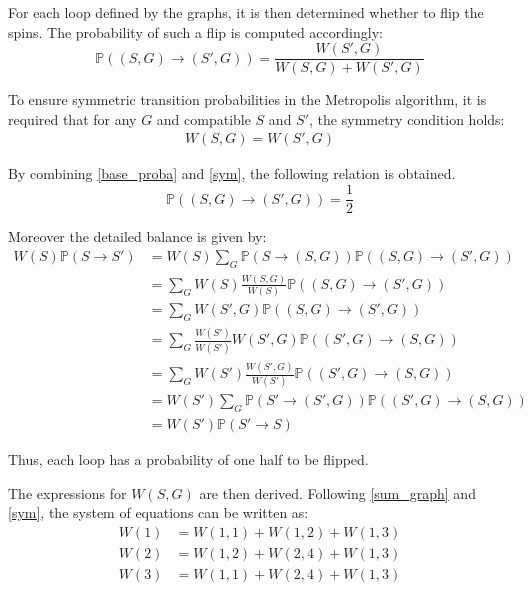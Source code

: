\documentclass[a4paper]{article}
\begin{document}
For each loop defined by the graphs, it is then determined whether to flip the spins. The probability of such a flip is computed accordingly:
\begin{equation} \label{base_proba}
    \mathbb{P}\left((S, G) \to (S', G)\right) = \frac{W(S', G)}{W(S, G) + W(S', G)}
\end{equation}

To ensure symmetric transition probabilities in the Metropolis algorithm, it is required that for any $G$ and compatible $S$ and $S'$, the symmetry condition holds:
\begin{align} \label{sym}
    W(S, G) = W(S', G)
\end{align}

By combining \cref{base_proba} and \cref{sym}, the following relation is obtained.
\begin{equation}
    \mathbb{P}\left((S, G) \to (S', G)\right) = \frac{1}{2}
\end{equation}

Moreover the detailed balance is given by:
\begin{align*}
    W(S) \mathbb{P}\left(S\to S'\right) &= W(S)\sum_G \mathbb{P}\left(S\to (S, G)\right)\mathbb{P}\left((S, G) \to (S', G)\right) \\
    &=\sum_G W(S)\frac{W(S, G)}{W(S)}\mathbb{P}\left((S, G) \to (S', G)\right) \\
    &=\sum_G W(S', G)\mathbb{P}\left((S, G) \to (S', G)\right) \\
    &=\sum_G \frac{W(S')}{W(S')} W(S', G)\mathbb{P}\left((S', G) \to (S, G)\right) \\
    &=\sum_G W(S')\frac{W(S', G)}{W(S')} \mathbb{P}\left((S', G) \to (S, G)\right) \\
    &= W(S')\sum_G \mathbb{P}\left(S'\to (S', G)\right)\mathbb{P}\left((S', G) \to (S, G)\right) \\
    &= W(S') \mathbb{P}\left(S'\to S\right)
\end{align*}

Thus, each loop has a probability of one half to be flipped.

The expressions for $W(S, G)$ are then derived. Following \cref{sum_graph} and \cref{sym}, the system of equations can be written as:
\begin{align*}
    W(1) &= W(1, 1) + W(1, 2) + W(1, 3) \\
    W(2) &= W(1, 2) + W(2, 4) + W(1, 3) \\
    W(3) &= W(1, 1) + W(2, 4) + W(1, 3)
\end{align*}
\end{document}
